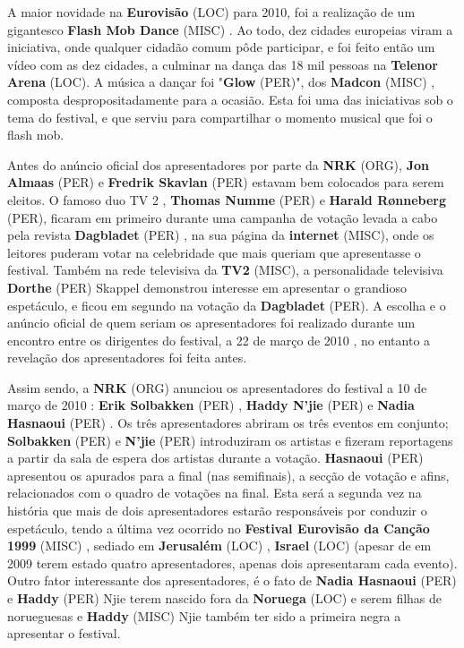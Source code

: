 \documentclass[12pt,a4paper]{article}
\begin{document}
A maior novidade na \textbf{Eurovisão} (LOC) para 2010, foi a realização de um gigantesco \textbf{Flash Mob Dance} (MISC) . Ao todo, dez cidades europeias viram a iniciativa, onde qualquer cidadão comum pôde participar, e foi feito então um vídeo com as dez cidades, a culminar na dança das 18 mil pessoas na \textbf{Telenor Arena} (LOC). A música a dançar foi "\textbf{Glow} (PER)", dos \textbf{Madcon} (MISC) , composta despropositadamente para a ocasião. Esta foi uma das iniciativas sob o tema do festival, e que serviu para compartilhar o momento musical que foi o flash mob.

Antes do anúncio oficial dos apresentadores por parte da \textbf{NRK} (ORG), \textbf{Jon Almaas} (PER) e \textbf{Fredrik Skavlan} (PER) estavam bem colocados para serem eleitos. O famoso duo TV 2 , \textbf{Thomas Numme} (PER) e \textbf{Harald Rønneberg} (PER), ficaram em primeiro durante uma campanha de votação levada a cabo pela revista \textbf{Dagbladet} (PER) , na sua página da \textbf{internet} (MISC), onde os leitores puderam votar na celebridade que mais queriam que apresentasse o festival. Também na rede televisiva da \textbf{TV2} (MISC), a personalidade televisiva \textbf{Dorthe} (PER) Skappel demonstrou interesse em apresentar o grandioso espetáculo, e ficou em segundo na votação da \textbf{Dagbladet} (PER). A escolha e o anúncio oficial de quem seriam os apresentadores foi realizado durante um encontro entre os dirigentes do festival, a 22 de março de 2010 , no entanto a revelação dos apresentadores foi feita antes.

Assim sendo, a \textbf{NRK} (ORG) anunciou os apresentadores do festival a 10 de março de 2010 : \textbf{Erik Solbakken} (PER) , \textbf{Haddy N'jie} (PER) e \textbf{Nadia Hasnaoui} (PER) . Os três apresentadores abriram os três eventos em conjunto; \textbf{Solbakken} (PER) e \textbf{N'jie} (PER) introduziram os artistas e fizeram reportagens a partir da sala de espera dos artistas durante a votação. \textbf{Hasnaoui} (PER) apresentou os apurados para a final (nas semifinais), a secção de votação e afins, relacionados com o quadro de votações na final. Esta será a segunda vez na história que mais de dois apresentadores estarão responsáveis por conduzir o espetáculo, tendo a última vez ocorrido no \textbf{Festival Eurovisão da Canção 1999} (MISC) , sediado em \textbf{Jerusalém} (LOC) , \textbf{Israel} (LOC) (apesar de em 2009 terem estado quatro apresentadores, apenas dois apresentaram cada evento). Outro fator interessante dos apresentadores, é o fato de \textbf{Nadia Hasnaoui} (PER) e \textbf{Haddy} (PER) Njie terem nascido fora da \textbf{Noruega} (LOC) e serem filhas de norueguesas e \textbf{Haddy} (MISC) Njie também ter sido a primeira negra a apresentar o festival.
\end{document}
